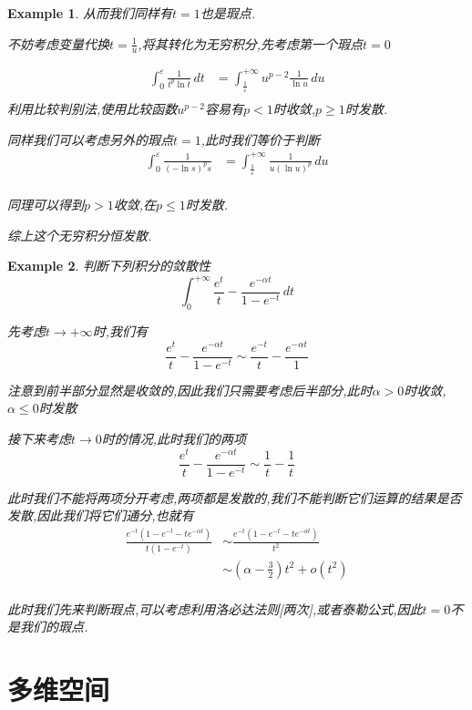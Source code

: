 \documentclass[11pt,hyperref,a4paper,UTF8]{ctexart}
\newtheorem{example}{Example}[subsection]
\newcommand{\parameter}[1]{\left(#1\right)}
\begin{document}
\begin{CJK}{UTF8}{gkai}
\begin{example}
  从而我们同样有$t = 1$也是瑕点.

  不妨考虑变量代换$t = \frac{1}{u}$,将其转化为无穷积分,先考虑第一个瑕点$t = 0$

  \[
  \begin{aligned}
    \int_{0}^{\varepsilon} \frac{1}{t^p \ln t} \,dt &= \int_{\frac{1}{\varepsilon}}^{+\infty} u^{p - 2} \frac{1}{\ln u}\, du\\
  \end{aligned}  
    \]
    利用比较判别法,使用比较函数$u^{p - 2}$容易有$p < 1$时收敛,$p \geq 1$时发散.

    同样我们可以考虑另外的瑕点$t = 1$,此时我们等价于判断
    \[
    \begin{aligned}
    \int_{0}^{\varepsilon} \frac{1}{(-\ln s)^p s} &= \int_{\frac{1}{\varepsilon}}^{+\infty} \frac{1}{u(\ln u)^p}\,du\\  
    \end{aligned}
    \]

    同理可以得到$p > 1$收敛,在$p \leq 1$时发散.

    综上这个无穷积分恒发散.
\end{example}

\begin{example}
  判断下列积分的敛散性
  \[\int_{0}^{+\infty}\frac{e^t}{t} - \frac{e^{-\alpha t}}{1 - e^{-t}}\, dt\]

  先考虑$t \to +\infty$时,我们有
  \[\frac{e^t}{t} - \frac{e^{-\alpha t}}{1 - e^{-t}} \sim \frac{e^{-t}}{t} - \frac{e^{-\alpha t}}{1}\]

  注意到前半部分显然是收敛的,因此我们只需要考虑后半部分,此时$\alpha > 0$时收敛,$\alpha \leq 0$时发散

  接下来考虑$t \to 0$时的情况,此时我们的两项
  \[\frac{e^t}{t} - \frac{e^{-\alpha t}}{1 - e^{-t}} \sim \frac{1}{t} - \frac{1}{t}\]

  此时我们不能将两项分开考虑,两项都是发散的,我们不能判断它们运算的结果是否发散,因此我们将它们通分,也就有
  \[
  \begin{aligned}
    \frac{e^{-t}(1 - e^{-t} - te^{-\alpha t})}{t(1 - e^{-t})}& \sim \frac{e^{-t}(1 - e^{-t} - te^{-\alpha t})}{t^2}\\
    &\sim \parameter{\alpha - \frac{3}{2}}t^2 + o(t^2)\\
  \end{aligned}  
  \]

  此时我们先来判断瑕点,可以考虑利用洛必达法则[两次],或者泰勒公式,因此$t = 0$不是我们的瑕点.
\end{example}
\section{多维空间}


\end{CJK}
\end{document}
